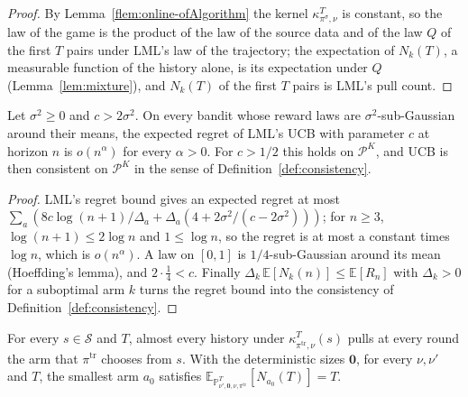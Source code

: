 \documentclass[11pt]{article}
\newcommand{\E}{\mathbb{E}}
\begin{document}
\begin{proof}
By Lemma~\ref{flem:online-ofAlgorithm} the kernel $\kappa^T_{\pi^\sigma,\nu}$ is constant, so the
law of the game is the product of the law of the source data and of the law $Q$ of the first $T$
pairs under LML's law of the trajectory; the expectation of $N_k(T)$, a measurable function of the
history alone, is its expectation under $Q$ (Lemma~\ref{lem:mixture}), and $N_k(T)$ of the first $T$
pairs is LML's pull count.
\end{proof}

\begin{lemma}\label{flem:ucb-consistent}
Let $\sigma^2\ge0$ and $c>2\sigma^2$. On every bandit whose reward laws are
$\sigma^2$-sub-Gaussian around their means, the expected regret of LML's UCB with parameter $c$
at horizon $n$ is $o(n^\alpha)$ for every $\alpha>0$. For $c>1/2$ this holds on $\mathcal P^K$, and
UCB is then consistent on $\mathcal P^K$ in the sense of Definition~\ref{def:consistency}.
\end{lemma}

\begin{proof}
LML's regret bound gives an expected regret at most
$\sum_a(8c\log(n+1)/\Delta_a+\Delta_a(4+2\sigma^2/(c-2\sigma^2)))$; for $n\ge3$,
$\log(n+1)\le2\log n$ and $1\le\log n$, so the regret is at most a constant times $\log n$, which
is $o(n^\alpha)$. A law on $[0,1]$ is $1/4$-sub-Gaussian around its mean (Hoeffding's lemma), and
$2\cdot\frac14<c$. Finally $\Delta_k\,\E[N_k(n)]\le\E[R_n]$ with $\Delta_k>0$ for a suboptimal arm
$k$ turns the regret bound into the consistency of Definition~\ref{def:consistency}.
\end{proof}

\begin{lemma}\label{flem:followSource-pulls}
For every $s\in\mathcal S$ and $T$, almost every history under
$\kappa^T_{\pi^{\mathrm{tr}},\nu}(s)$ pulls at every round the arm that $\pi^{\mathrm{tr}}$ chooses
from $s$. With the deterministic sizes $\mathbf 0$, for every $\nu,\nu'$ and $T$, the smallest arm
$a_0$ satisfies $\E_{\mathbb P^T_{\nu',\mathbf 0,\nu,\pi^{\mathrm{tr}}}}[N_{a_0}(T)]=T$.
\end{lemma}
\end{document}

